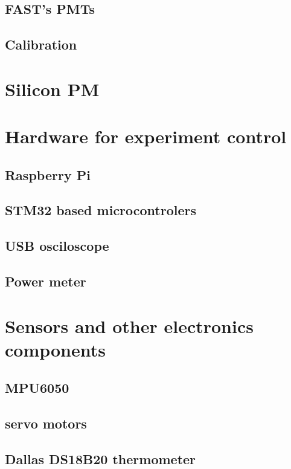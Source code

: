 \subsection{FAST's PMTs}

\subsection{Calibration}


\section{Silicon PM}


\section{Hardware for experiment control}

\subsection{Raspberry Pi}

\subsection{STM32 based microcontrolers}

\subsection{USB osciloscope}

\subsection{Power meter}

\section{Sensors and other electronics components}

\subsection{MPU6050}

\subsection{servo motors}

\subsection{Dallas DS18B20 thermometer}

